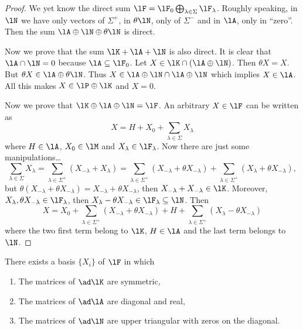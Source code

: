 \begin{proof}
We yet know the direct sum $\lF=\lF_0\bigoplus_{\lambda\in\Sigma}\lF_{\lambda}$. Roughly speaking, in $\lN$ we have only vectors of $\Sigma^+$, in $\theta\lN$, only of $\Sigma^-$ and in $\lA$, only in ``zero''. Then the sum $\lA\oplus\lN\oplus\theta\lN$ is direct.

Now we prove that the sum $\lK+\lA+\lN$ is also direct. It is clear that $\lA\cap\lN=0$ because $\lA\subseteq\lF_0$. Let $X\in\lK\cap(\lA\oplus\lN)$. Then $\theta X=X$. But $\theta X\in\lA\oplus\theta\lN$. Thus $X\in\lA\oplus\lN\cap\lA\oplus\lN$ which implies $X\in\lA$. All this makes $X\in\lP\oplus\lK$ and $X=0$.

Now we prove that $\lK\oplus\lA\oplus\lN=\lF$. An arbitrary $X\in\lF$ can be written as
\[
   X=H+X_0+\sum_{\lambda\in\Sigma}X_{\lambda}
\]
where $H\in\lA$, $X_0\in\lM$ and $X_{\lambda}\in\lF_{\lambda}$. Now there are just some manipulations\ldots
\begin{equation}
  \sum_{\lambda\in\Sigma}X_{\lambda}=\sum_{\lambda\in\Sigma^+}(X_{-\lambda}+X_{\lambda})
                                  =\sum_{\lambda\in\Sigma^+}(X_{-\lambda}+\theta X_{-\lambda})
                  +\sum_{\lambda\in\Sigma^+}(X_{\lambda}+\theta X_{-\lambda}),
\end{equation}
but $\theta(X_{-\lambda}+\theta X_{-\lambda})=X_{-\lambda}+\theta X_{-\lambda}$, then $X_{-\lambda}+X_{-\lambda}\in\lK$. Moreover, $X_{\lambda}, \theta X_{-\lambda}\in\lF_{\lambda}$, then $X_{\lambda}-\theta X_{-\lambda}\in\lF_{\lambda}\subseteq\lN$. Then
\begin{equation}
  X=X_0+\sum_{\lambda\in\Sigma^+}(X_{-\lambda}+\theta X_{-\lambda})+H+\sum_{\lambda\in\Sigma^+}(X_{\lambda}-\theta X_{-\lambda})
\end{equation}
where the two first term belong to $\lK$, $H\in\lA$ and the last term belongs to $\lN$.
\end{proof}

\begin{lemma}
There exists a basis $\{X_i\}$ of $\lF$ in which

\begin{enumerate}
\item\label{enudi} The matrices of $\ad\lK$ are symmetric,
\item\label{enudii} The matrices of $\ad\lA$ are diagonal and real,
\item\label{enudiii} The matrices of $\ad\lN$ are upper triangular with zeros on the diagonal.
\end{enumerate}
\end{lemma}


